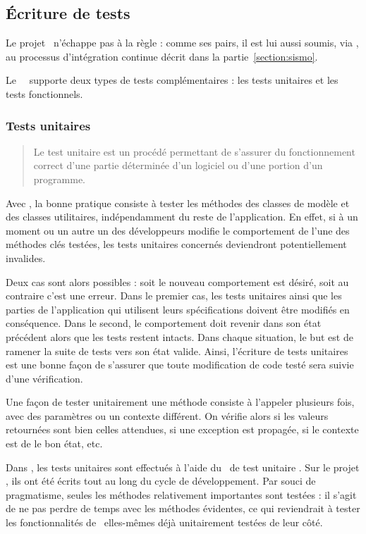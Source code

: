 \subsection{Écriture de tests}
\label{section:eyrolles_tests}

Le projet \aey\ n'échappe pas à la règle : comme ses pairs, il est lui aussi soumis, via \asismo, au processus d'intégration continue décrit dans la partie~\ref{section:sismo}.

Le \afm\ \asf\ supporte deux types de tests complémentaires : les tests unitaires et les tests fonctionnels.


\subsubsection{Tests unitaires}

\begin{quote}
Le test unitaire est un procédé permettant de s'assurer du fonctionnement correct d'une partie déterminée d'un logiciel ou d'une portion d'un programme.\cite{unit}
\end{quote}

Avec \asf, la bonne pratique consiste à tester les méthodes des classes de modèle et des classes utilitaires, indépendamment du reste de l'application. En effet, si à un moment ou un autre un des développeurs modifie le comportement de l'une des méthodes clés testées, les tests unitaires concernés deviendront potentiellement invalides.

Deux cas sont alors possibles : soit le nouveau comportement est désiré, soit au contraire c'est une erreur. Dans le premier cas, les tests unitaires ainsi que les parties de l'application qui utilisent leurs spécifications doivent être modifiés en conséquence. Dans le second, le comportement doit revenir dans son état précédent alors que les tests restent intacts. Dans chaque situation, le but est de ramener la suite de tests vers son état valide. Ainsi, l'écriture de tests unitaires est une bonne façon de s'assurer que toute modification de code testé sera suivie d'une vérification.

Une façon de tester unitairement une méthode consiste à l'appeler plusieurs fois, avec des paramètres ou un contexte différent. On vérifie alors si les valeurs retournées sont bien celles attendues, si une exception est propagée, si le contexte est de le bon état, etc.

Dans \asf, les tests unitaires sont effectués à l'aide du \afm\ de test unitaire \alime. Sur le projet \aey, ils ont été écrits tout au long du cycle de développement. Par souci de pragmatisme, seules les méthodes relativement importantes sont testées : il s'agit de ne pas perdre de temps avec les méthodes évidentes, ce qui reviendrait à tester les fonctionnalités de \asf\ elles-mêmes déjà unitairement testées de leur côté.


